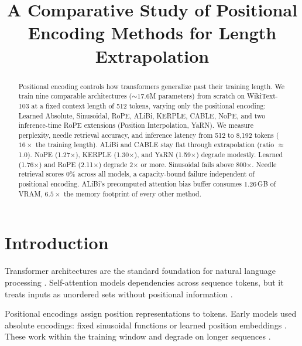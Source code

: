 \documentclass[conference]{IEEEtran}
\begin{document}
\title{A Comparative Study of Positional Encoding Methods for Length Extrapolation}

\author{
}

\maketitle

\begin{abstract}
Positional encoding controls how transformers generalize past their training length. We train nine comparable architectures ($\sim$17.6M parameters) from scratch on WikiText-103 at a fixed context length of 512 tokens, varying only the positional encoding: Learned Absolute, Sinusoidal, RoPE, ALiBi, KERPLE, CABLE, NoPE, and two inference-time RoPE extensions (Position Interpolation, YaRN). We measure perplexity, needle retrieval accuracy, and inference latency from 512 to 8,192 tokens ($16\times$ the training length). ALiBi and CABLE stay flat through extrapolation (ratio $\approx$1.0). NoPE (1.27$\times$), KERPLE (1.30$\times$), and YaRN (1.59$\times$) degrade modestly. Learned (1.76$\times$) and RoPE (2.11$\times$) degrade 2$\times$ or more. Sinusoidal fails above 800$\times$. Needle retrieval scores 0\% across all models, a capacity-bound failure independent of positional encoding. ALiBi's precomputed attention bias buffer consumes 1.26\,GB of VRAM, $6.5\times$ the memory footprint of every other method.
\end{abstract}

\section{Introduction}
\label{sec:introduction}

Transformer architectures are the standard foundation for natural language processing \cite{vaswani2017,touvron2023}. Self-attention models dependencies across sequence tokens, but it treats inputs as unordered sets without positional information \cite{vaswani2017}.

Positional encodings assign position representations to tokens. Early models used absolute encodings: fixed sinusoidal functions or learned position embeddings \cite{vaswani2017,devlin2019,radford2019}. These work within the training window and degrade on longer sequences \cite{press2022}.
\end{document}
